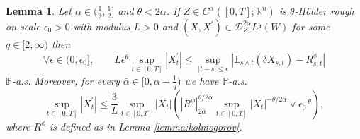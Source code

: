 \documentclass[11pt,a4paper]{article}
\newcommand{\R}{\mathbb{R}}
\newcommand{\E}{\mathbb{E}}
\theoremstyle{plain}
\newtheorem{lemma}[defn]{Lemma}
\begin{document}
    
\begin{lemma}
    \label{lem: key estimate norris}
    Let $\alpha \in (\frac{1}{3}, \frac{1}{2}]$ and $\theta < 2\alpha$. If ${Z} \in {C}^{\alpha}([0,T];\R^n)$ is $\theta$-H\"older rough on scale $\epsilon_0>0$ with modulus $L>0$ and $(X,X^{\prime})\in \mathscr{D}_{Z}^{2\alpha}L^{q}(W)$ { for some $q \in  [2,\infty)$} then
    \begin{equation*}
        \forall \epsilon \in (0,\epsilon_0],
        \qquad
        L \epsilon^{\theta}
        \sup_{t\in[0,T]} 
        |X^{\prime}_t|
        \leq \sup_{|t-s|\leq \epsilon}
        |
            \mathbb{E}_{s \wedge t}(\delta X_{s,t}) -  R^\phi_{s,t}
        |
    \end{equation*} 
    $\mathbb{P}$-a.s.
    Moreover, for every { $\bar{\alpha} \in [0,\alpha-\frac{1}{q})$}
    we have $\mathbb{P}$-a.s.
    \begin{equation*}
    \sup_{t\in[0,T]}|X^{\prime}_t| 
    {
     \le \frac{3}{L} \sup_{t \in [0,T]} |X_t|
    }
    \left(|R^\phi|_{2\bar{\alpha}}^{\theta/2\bar{\alpha}} \sup_{t\in[0,T]}|X_t|^{-\theta/2\bar{\alpha}} \vee \epsilon_0^{-\theta}
        \right), 
    \end{equation*}
    where $R^\phi$ is defined as in Lemma \ref{lemma:kolmogorov}. 
\end{lemma}

\end{document}
